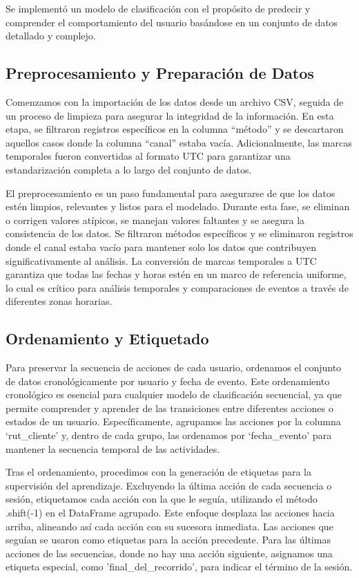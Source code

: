 Se implementó un modelo de clasificación con el propósito de predecir y comprender el comportamiento del usuario basándose en un conjunto de datos detallado y complejo.

\subsection{Preprocesamiento y Preparación de Datos}

Comenzamos con la importación de los datos desde un archivo CSV, seguida de un proceso de limpieza para asegurar la integridad de la información. En esta etapa, se filtraron registros específicos en la columna “método” y se descartaron aquellos casos donde la columna “canal” estaba vacía. Adicionalmente, las marcas temporales fueron convertidas al formato UTC para garantizar una estandarización completa a lo largo del conjunto de datos.

El preprocesamiento es un paso fundamental para asegurarse de que los datos estén limpios, relevantes y listos para el modelado. Durante esta fase, se eliminan o corrigen valores atípicos, se manejan valores faltantes y se asegura la consistencia de los datos. Se filtraron métodos específicos y se eliminaron registros donde el canal estaba vacío para mantener solo los datos que contribuyen significativamente al análisis. La conversión de marcas temporales a UTC garantiza que todas las fechas y horas estén en un marco de referencia uniforme, lo cual es crítico para análisis temporales y comparaciones de eventos a través de diferentes zonas horarias.

\subsection{Ordenamiento y Etiquetado}

Para preservar la secuencia de acciones de cada usuario, ordenamos el conjunto de datos cronológicamente por usuario y fecha de evento. Este ordenamiento cronológico es esencial para cualquier modelo de clasificación secuencial, ya que permite comprender y aprender de las transiciones entre diferentes acciones o estados de un usuario. Específicamente, agrupamos las acciones por la columna ‘rut\_cliente’ y, dentro de cada grupo, las ordenamos por ‘fecha\_evento’ para mantener la secuencia temporal de las actividades.

Tras el ordenamiento, procedimos con la generación de etiquetas para la supervisión del aprendizaje. Excluyendo la última acción de cada secuencia o sesión, etiquetamos cada acción con la que le seguía, utilizando el método .shift(-1) en el DataFrame agrupado. Este enfoque desplaza las acciones hacia arriba, alineando así cada acción con su sucesora inmediata. Las acciones que seguían se usaron como etiquetas para la acción precedente. Para las últimas acciones de las secuencias, donde no hay una acción siguiente, asignamos una etiqueta especial, como 'final\_del\_recorrido', para indicar el término de la sesión.

